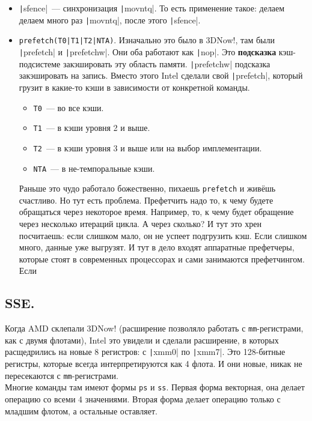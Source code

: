 \documentclass{article}
\begin{document}
\begin{itemize}
        \item \texttt|sfence|~--- синхронизация \texttt|movntq|. То есть применение такое: делаем делаем много раз \texttt|movntq|, после этого \texttt|sfence|.
        \item \Verb/prefetch(T0|T1|T2|NTA)/. Изначально это было в 3DNow!, там были \texttt|prefetch| и \texttt|prefetchw|. Они оба работают как \texttt|nop|. Это \textbf{подсказка} кэш-подсистеме закэшировать эту область памяти. \texttt|prefetchw| подсказка закэшировать на запись. Вместо этого Intel сделали свой \texttt|prefetch|, который грузит в какие-то кэши в зависимости от конкретной команды.
        \begin{itemize}
            \item \Verb|T0|~--- во все кэши.
            \item \Verb|T1|~--- в кэши уровня 2 и выше.
            \item \Verb|T2|~--- в кэши уровня 3 и выше или на выбор имплементации.
            \item \Verb|NTA|~--- в не-темпоральные кэши.
        \end{itemize}
        Раньше это чудо работало божественно, пихаешь \Verb|prefetch| и живёшь счастливо. Но тут есть проблема. Префетчить надо то, к чему будете обращаться через некоторое время. Например, то, к чему будет обращение через несколько итераций цикла. А через сколько? И тут это хрен посчитаешь: если слишком мало, он не успеет подгрузить кэш. Если слишком много, данные уже выгрузят. И тут в дело входят аппаратные префетчеры, которые стоят в современных процессорах и сами занимаются префетчингом. Если 
    \end{itemize}
    \subsection{SSE.}
    Когда AMD склепали 3DNow! (расширение позволяло работать с \Verb|mm|-регистрами, как с двумя флотами), Intel это увидели и сделали расширение, в которых расщедрились на новые 8 регистров: с \texttt|xmm0| по \texttt|xmm7|. Это 128-битные регистры, которые всегда интерпретируются как 4 флота. И они новые, никак не пересекаются с \Verb|mm|-регистрами.\\
    Многие команды там имеют формы \Verb|ps| и \Verb|ss|. Первая форма векторная, она делает операцию со всеми 4 значениями. Вторая форма делает операцию только с младшим флотом, а остальные оставляет.
\end{document}
